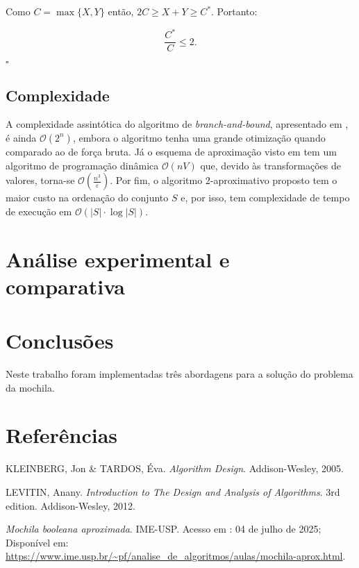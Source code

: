 \documentclass[12pt]{article}
\begin{document}
Como \(C=\max\{X,Y\}\) então, \(2C \geq X+Y \geq C^*\). Portanto:

\[\frac{C^*}{C} \leq 2.\]

\begin{flushright}
    \(\square\)
\end{flushright}

\subsection{Complexidade}

A complexidade assintótica do algoritmo de \textit{branch-and-bound}, apresentado em \cite{levitin}, é ainda \(\mathcal{O}(2^n)\), embora o algoritmo tenha uma grande otimização quando comparado ao de força bruta. Já o esquema de aproximação visto em \cite{kt} tem um algoritmo de programação dinâmica \(\mathcal{O}(nV)\) que, devido às transformações de valores, torna-se \(\mathcal{O}\left(\frac{n^3}{\varepsilon}\right)\). Por fim, o algoritmo \(2\)-aproximativo proposto tem o maior custo na ordenação do conjunto \(S\) e, por isso, tem complexidade de tempo de execução em \(\mathcal{O}(|S| \cdot \log |S|)\).


\section{Análise experimental e comparativa}

\section{Conclusões}

Neste trabalho foram implementadas três abordagens para a solução do problema da mochila.

\section{Referências}

\begin{thebibliography}{1}

 KLEINBERG, Jon \& TARDOS, Éva. \textit{Algorithm Design}. Addison-Wesley, 2005.

LEVITIN, Anany. \textit{Introduction to The Design and Analysis of Algorithms}. 3rd edition. Addison-Wesley, 2012.

 \textit{Mochila booleana aproximada}. IME-USP. Acesso em : 04 de julho de 2025; Disponível em: \url{https://www.ime.usp.br/~pf/analise_de_algoritmos/aulas/mochila-aprox.html}.

\end{thebibliography}
\end{document}
